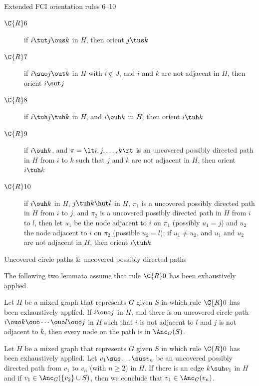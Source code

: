 \begin{frame}{Extended FCI orientation rules 6--10}
  \begin{description}
    \item[$\C{R}6$] if $i \tut j \ous k$ in $H$, then orient $j \tus k$
    \item[$\C{R}7$] if $i \suo j \out k$ in $H$ with $i \notin J$, and $i$ and $k$ are not adjacent in $H$, then orient $i \sut j$
  \end{description}
  \begin{description}
    \item[$\C{R}8$] if $i \tuh j \tuh k$ in $H$, and $i \ouh k$ in $H$, then orient $i \tuh k$
    \item[$\C{R}9$] if $i \ouh k$, and $\pi = \lt i, j, \dots, k \rt$ is an uncovered possibly directed path in $H$ from $i$ to $k$ such that $j$ and $k$ are not adjacent in $H$, then orient $i \tuh k$
    \item[$\C{R}10$] if $i \ouh k$ in $H$, $j \tuh k \hut l$ in $H$, $\pi_1$ is a uncovered possibly directed path in $H$ from $i$ to $j$, and $\pi_2$ is a uncovered possibly directed path in $H$ from $i$ to $l$, then let $u_1$ be the node adjacent to $i$ on $\pi_1$ (possibly $u_1 = j$) and $u_2$ the node adjacent to $i$ on $\pi_2$ (possible $u_2 = l$); if $u_1 \ne u_2$, and $u_1$ and $u_2$ are not adjacent in $H$, then orient $i \tuh k$
  \end{description}
\end{frame}

\begin{frame}{Uncovered circle paths \& uncovered possibly directed paths}

The following two lemmata assume that rule $\C{R}0$ has been exhaustively applied.
\begin{Lem}[\ref{lem:detecting_selection_bias}]
  Let $H$ be a mixed graph that represents $G$ given $S$ in which rule $\C{R}0$ has been exhaustively applied.
  If $i \ouo j$ in $H$, and there is an uncovered circle path $i \ouo k \ouo \cdots \ouo l \ouo j$ in $H$ such that $i$ is not adjacent to $l$ and $j$ is not adjacent to $k$, then every node on the path is in $\Anc_G(S)$.
\end{Lem}
\begin{Lem}[\ref{lem:upd_path}]
Let $H$ be a mixed graph that represents $G$ given $S$ in which rule $\C{R}0$ has been exhaustively applied.
Let $v_1 \sus \dots \sus v_n$ be an uncovered possibly directed path from $v_1$ to $v_n$ (with $n \ge 2$) in $H$.
If there is an edge $k \suh v_1$ in $H$ and if $v_1 \in \Anc_G(\{v_2\} \cup S)$, then we conclude that $v_1 \in \Anc_G(v_n)$.
\end{Lem}
\end{frame}

